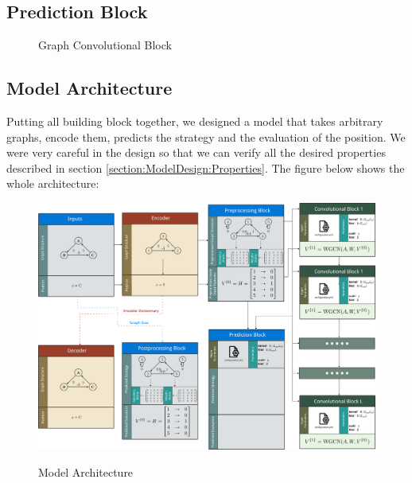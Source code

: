 \subsection{Prediction Block}
\begin{figure}[H]
	\noindent
	
	\caption{Graph Convolutional Block}
	\label{fig:PredictionBlock}
\end{figure}
\FloatBarrier
\subsection{Model Architecture}
Putting all building block together, we designed a model that takes arbitrary graphs, encode them, predicts the strategy and the evaluation of the position.
\newline We were very careful in the design so that we can verify all the desired properties described in section \ref{section:ModelDesign:Properties}.
\newline The figure below shows the whole architecture:

\begin{landscape}

	\begin{figure}[H]
	\centering
		
		{\includegraphics[height=0.93\textheight]{Figures/Architecture.png}}
		\caption{Model Architecture}
		\label{fig:ModelArchitecture}
	\end{figure}
	
\end{landscape}
